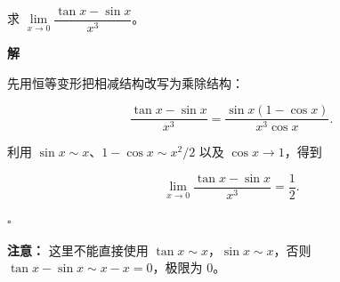 \documentclass[fontset=fandol]{ctexart}
\newenvironment{custom}[1]{\par\noindent\textbf{#1}\quad}{\par\vspace{0.8em}}
\newenvironment{solution}{\par\noindent\textbf{解}\quad}{\hfill$\square$\par\vspace{0.8em}}
\begin{document}
\begin{example}[加减结构中的易错点]

求 \(\lim\limits_{x \to 0} \dfrac{\tan x - \sin x}{x^3}\)。









\begin{solution}

	先用恒等变形把相减结构改写为乘除结构：

	\[

	\frac{\tan x-\sin x}{x^3}

	=\frac{\sin x(1-\cos x)}{x^3\cos x}.

	\]

	利用 \(\sin x\sim x\)、\(1-\cos x\sim x^2/2\) 以及 \(\cos x\to1\)，得到

	\[

	\lim_{x\to0}\frac{\tan x-\sin x}{x^3}

	=\frac12.

	\]

	

\end{solution}



\textbf{注意：} 这里不能直接使用 \(\tan x \sim x\)，\(\sin x \sim x\)，否则 \(\tan x - \sin x \sim x - x = 0\)，极限为 0。

\end{example}
\end{document}
